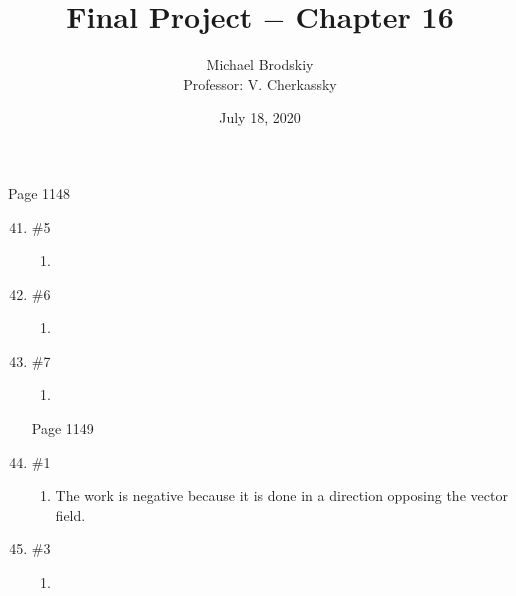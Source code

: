 \documentclass[12pt]{article}
\title{Final Project $-$ Chapter 16}
\date{July 18, 2020}
\author{Michael Brodskiy\\ \small Professor: V. Cherkassky}
\begin{document}
\maketitle

\begin{center}

Page 1148

\end{center}

\begin{enumerate}

\setcounter{enumi}{40}

  \item \#5 \begin{enumerate}

      \item  

    \end{enumerate}

  \item \#6 \begin{enumerate}

      \item 

    \end{enumerate}


    \item \#7

    \begin{enumerate}

      \item 
      
    \end{enumerate}

\begin{center}

Page 1149

\end{center}

    \item \#1 \begin{enumerate}

        \item The work is negative because it is done in a direction opposing the vector field.

\end{enumerate}

    \item \#3 \begin{enumerate}

        \item 


\end{enumerate}
\end{enumerate}
\end{document}
